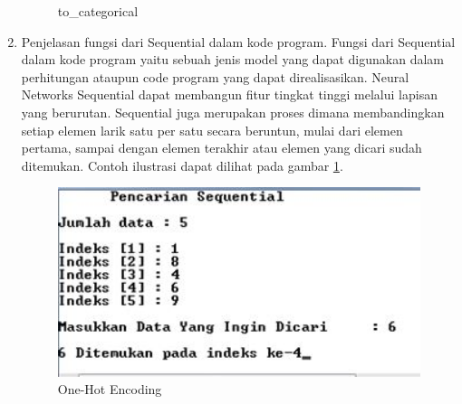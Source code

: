 \begin{enumerate}
\begin{figure}[!htbp]
\caption{to\_categorical}
\end{figure} 
\item Penjelasan fungsi dari Sequential dalam kode program.
\subitem Fungsi dari Sequential dalam kode program yaitu sebuah jenis model yang dapat digunakan dalam perhitungan ataupun code program yang dapat direalisasikan. Neural Networks Sequential dapat membangun fitur tingkat tinggi melalui lapisan yang berurutan. Sequential juga merupakan proses dimana membandingkan setiap elemen larik satu per satu secara beruntun, mulai dari elemen pertama, sampai dengan elemen terakhir atau elemen yang dicari sudah ditemukan.  Contoh ilustrasi dapat dilihat pada gambar \ref{c6t_8}.
\begin{figure}[!htbp]
\centerline{\includegraphics[width=1\textwidth]{figures/c6t/8.JPG}}
\caption{One-Hot Encoding}
\label{c6t_8}
\end{figure} 
\end{enumerate}